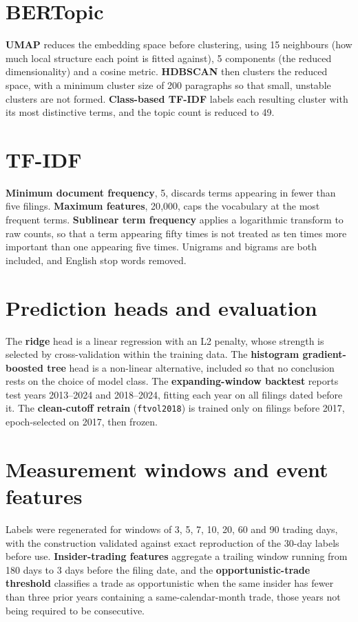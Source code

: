 \documentclass[logo,msc,ai]{infthesis}        %
\begin{document}
\section*{BERTopic}
\textbf{UMAP} reduces the embedding space before clustering, using 15 neighbours (how much local structure each point is fitted against), 5 components (the reduced dimensionality) and a cosine metric. \textbf{HDBSCAN} then clusters the reduced space, with a minimum cluster size of 200 paragraphs so that small, unstable clusters are not formed. \textbf{Class-based TF-IDF} labels each resulting cluster with its most distinctive terms, and the topic count is reduced to 49.

\section*{TF-IDF}
\textbf{Minimum document frequency}, 5, discards terms appearing in fewer than five filings. \textbf{Maximum features}, 20{,}000, caps the vocabulary at the most frequent terms. \textbf{Sublinear term frequency} applies a logarithmic transform to raw counts, so that a term appearing fifty times is not treated as ten times more important than one appearing five times. Unigrams and bigrams are both included, and English stop words removed.

\section*{Prediction heads and evaluation}
The \textbf{ridge} head is a linear regression with an L2 penalty, whose strength is selected by cross-validation within the training data. The \textbf{histogram gradient-boosted tree} head is a non-linear alternative, included so that no conclusion rests on the choice of model class. The \textbf{expanding-window backtest} reports test years 2013--2024 and 2018--2024, fitting each year on all filings dated before it. The \textbf{clean-cutoff retrain} (\texttt{ftvol2018}) is trained only on filings before 2017, epoch-selected on 2017, then frozen.

\section*{Measurement windows and event features}
Labels were regenerated for windows of 3, 5, 7, 10, 20, 60 and 90 trading days, with the construction validated against exact reproduction of the 30-day labels before use. \textbf{Insider-trading features} aggregate a trailing window running from 180 days to 3 days before the filing date, and the \textbf{opportunistic-trade threshold} classifies a trade as opportunistic when the same insider has fewer than three prior years containing a same-calendar-month trade, those years not being required to be consecutive.
\end{document}
